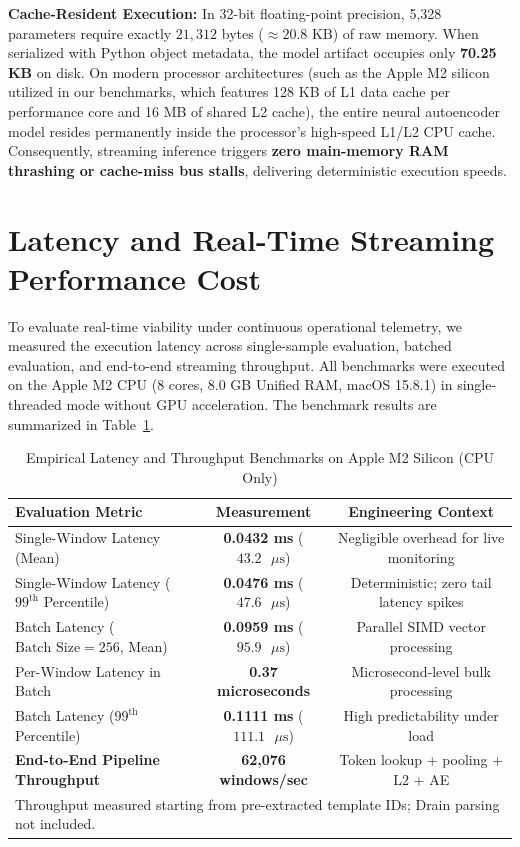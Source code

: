 \textbf{Cache-Resident Execution:} In 32-bit floating-point precision, 5,328 parameters require exactly $21,312$ bytes ($\approx 20.8\text{ KB}$) of raw memory. When serialized with Python object metadata, the model artifact occupies only \textbf{70.25 KB} on disk. On modern processor architectures (such as the Apple M2 silicon utilized in our benchmarks, which features 128 KB of L1 data cache per performance core and 16 MB of shared L2 cache), the entire neural autoencoder model resides permanently inside the processor's high-speed L1/L2 CPU cache. Consequently, streaming inference triggers \textbf{zero main-memory RAM thrashing or cache-miss bus stalls}, delivering deterministic execution speeds.

\section{Latency and Real-Time Streaming Performance Cost}
\label{sec:cost_latency}
To evaluate real-time viability under continuous operational telemetry, we measured the execution latency across single-sample evaluation, batched evaluation, and end-to-end streaming throughput. All benchmarks were executed on the Apple M2 CPU (8 cores, 8.0 GB Unified RAM, macOS 15.8.1) in single-threaded mode without GPU acceleration. The benchmark results are summarized in Table~\ref{tab:latency_benchmarks}.

\begin{table}[htbp]
\centering
\caption{Empirical Latency and Throughput Benchmarks on Apple M2 Silicon (CPU Only)}
\label{tab:latency_benchmarks}
\begin{tabular}{lcc}
\toprule
\textbf{Evaluation Metric} & \textbf{Measurement} & \textbf{Engineering Context} \\
\midrule
Single-Window Latency (Mean) & \textbf{0.0432 ms} ($43.2\text{ }\mu\text{s}$) & Negligible overhead for live monitoring \\
Single-Window Latency ($99^{\text{th}}$ Percentile) & \textbf{0.0476 ms} ($47.6\text{ }\mu\text{s}$) & Deterministic; zero tail latency spikes \\
Batch Latency ($\text{Batch Size} = 256$, Mean) & \textbf{0.0959 ms} ($95.9\text{ }\mu\text{s}$) & Parallel SIMD vector processing \\
Per-Window Latency in Batch & \textbf{0.37 microseconds} & Microsecond-level bulk processing \\
Batch Latency ($99^{\text{th}}$ Percentile) & \textbf{0.1111 ms} ($111.1\text{ }\mu\text{s}$) & High predictability under load \\
\midrule
\textbf{End-to-End Pipeline Throughput} & \textbf{62,076 windows/sec} & Token lookup + pooling + L2 + AE \\
\bottomrule
\multicolumn{3}{l}{\footnotesize *Throughput measured starting from pre-extracted template IDs; Drain parsing not included.}
\end{tabular}
\end{table}

